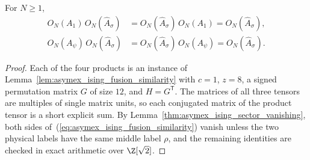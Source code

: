 \begin{lemma}%
    \label{thm:asymex_ising_sigma_fusion}
    \leanok
    For $N\geq1$,
    \begin{align}
        O_N(A_1)\,O_N(\widehat A_\sigma)
         & =O_N(\widehat A_\sigma)\,O_N(A_1)
        =O_N(\widehat A_\sigma),                \\
        O_N(A_\psi)\,O_N(\widehat A_\sigma)
         & =O_N(\widehat A_\sigma)\,O_N(A_\psi)
        =O_N(\widehat A_\sigma).
    \end{align}
\end{lemma}

\begin{proof}
    \leanok
    Each of the four products is an instance of
    Lemma~\ref{lem:asymex_ising_fusion_similarity} with $c=1$, $z=8$,
    a signed permutation matrix $G$ of size $12$, and $H=G^{\mathsf T}$. The
    matrices of all three tensors are multiples of single matrix units,
    so each conjugated matrix of the product tensor is a short explicit
    sum. By Lemma~\ref{thm:asymex_ising_sector_vanishing}, both sides
    of~(\ref{eq:asymex_ising_fusion_similarity}) vanish unless the two
    physical labels have the same middle label $\rho$, and the remaining
    identities are checked in exact arithmetic over $\Z[\sqrt2]$.
\end{proof}

